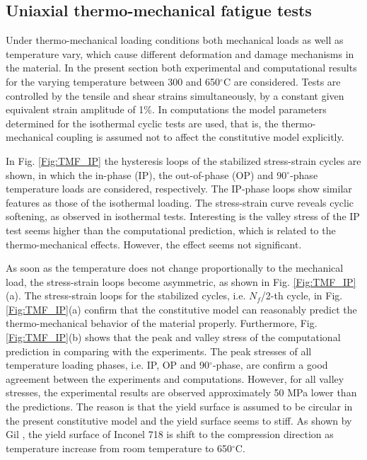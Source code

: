 \subsection{Uniaxial thermo-mechanical fatigue tests}
\noindent
Under thermo-mechanical loading conditions both mechanical loads as well as temperature vary, which cause different deformation and damage mechanisms in the material.
In the present section both experimental and computational results for the varying temperature between 300 and 650$^{\circ}$C are considered. Tests are controlled by the tensile and shear strains simultaneously, by a constant given equivalent strain amplitude of 1\%. In computations the model parameters determined for the isothermal cyclic tests are used, that is, the thermo-mechanical coupling is assumed not to affect the constitutive model explicitly.

In Fig. \ref{Fig:TMF_IP} the hysteresis loops of the stabilized stress-strain cycles are shown, in which the in-phase (IP), the out-of-phase (OP) and 90$^\circ$-phase temperature loads are considered, respectively.
The IP-phase loops show similar features as those of the isothermal loading.
The stress-strain curve reveals cyclic softening, as observed in isothermal tests. Interesting is the valley stress of the IP test seems higher than the computational prediction, which is related to the thermo-mechanical effects. However, the effect seems not significant.

As soon as the temperature does not change proportionally to the mechanical load, the stress-strain loops become asymmetric, as shown in Fig. \ref{Fig:TMF_IP}(a).
The stress-strain loops for the stabilized cycles, i.e. $N_f$/2-th cycle, in Fig. \ref{Fig:TMF_IP}(a) confirm that the constitutive model can reasonably predict the thermo-mechanical behavior of the material properly.
Furthermore, Fig. \ref{Fig:TMF_IP}(b) shows that the peak and valley stress of the computational prediction in comparing with the experiments.
The peak stresses of all temperature loading phases, i.e. IP, OP and 90$^\circ$-phase, are confirm a good agreement between the experiments and computations.
However, for all valley stresses, the experimental results are observed approximately 50 MPa lower than the predictions.
The reason is that the yield surface is assumed to be circular in the present constitutive model and the yield surface seems to stiff.
As shown by Gil \cite{Gil1998}, the yield surface of Inconel 718 is shift to the compression direction as temperature increase from room temperature to 650$^{\circ}$C.

